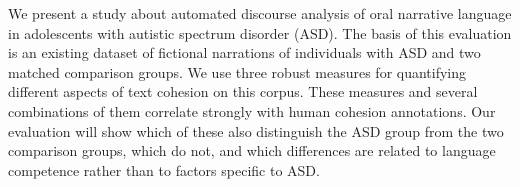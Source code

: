 We present a study about automated discourse analysis of oral narrative language in adolescents with autistic spectrum disorder (ASD). The basis of this evaluation is an existing dataset of fictional narrations of individuals with ASD and two matched comparison groups. We use three robust measures for quantifying different aspects of text cohesion on this corpus. These measures and several combinations of them correlate strongly with human cohesion annotations. Our evaluation will show which of these also distinguish the ASD group from the two comparison  groups, which do not, and which differences are related to language competence rather than to factors specific to ASD.
